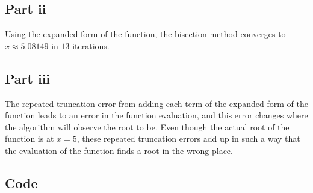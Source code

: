 \documentclass[12pt]{exam}
\begin{document}
\subsection*{Part ii}
Using the expanded form of the function, the bisection method converges to $x\approx 5.08149$ in $13$ iterations. 
\subsection*{Part iii}
The repeated truncation error from adding each term of the expanded form of the function leads to an error in the function evaluation, and this error changes where the algorithm will observe the root to be. Even though the actual root of the function is at $x=5$, these repeated truncation errors add up in such a way that the evaluation of the function finds a root in the wrong place. 
\subsection*{Code}
%

\end{document}
